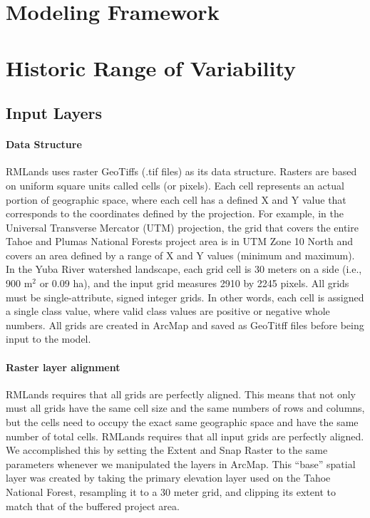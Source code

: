 \section{Modeling Framework}

\section{Historic Range of Variability}

\subsection{Input Layers}

\paragraph{Data Structure} RMLands uses raster GeoTiffs (.tif files) as its data structure. Rasters are based on uniform square units called cells (or pixels). Each cell represents an actual portion of geographic space, where each cell has a defined X and Y value that corresponds to the coordinates defined by the projection. For example, in the Universal Transverse Mercator (UTM) projection, the grid that covers the entire Tahoe and Plumas National Forests project area is in UTM Zone 10 North and covers an area defined by a range of X and Y values (minimum and maximum). In the Yuba River watershed landscape, each grid cell is 30 meters on a side (i.e., 900 m$^2$ or 0.09 ha), and the input grid measures 2910 by 2245 pixels. All grids must be single-attribute, signed integer grids. In other words, each cell is assigned a single class value, where valid class values are positive or negative whole numbers. All grids are created in ArcMap and saved as GeoTitff files before being input to the model. 

\paragraph{Raster layer alignment} RMLands requires that all grids are perfectly aligned. This means that not only must all grids have the same cell size and the same numbers of rows and columns, but the cells need to occupy the exact same geographic space and have the same number of total cells. RMLands requires that all input grids are perfectly aligned. We accomplished this by setting the Extent and Snap Raster to the same parameters whenever we manipulated the layers in ArcMap. This ``base'' spatial layer was created by taking the primary elevation layer used on the Tahoe National Forest, resampling it to a 30 meter grid, and clipping its extent to match that of the buffered project area.

